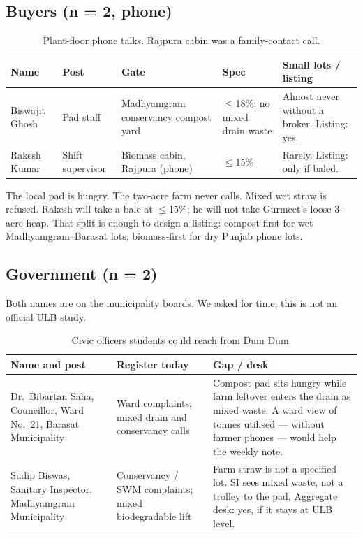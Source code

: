\documentclass[12pt,a4paper]{article}
\begin{document}
\subsection{Buyers (n = 2, phone)}
\begin{table}[h]
\centering
\caption{Plant-floor phone talks. Rajpura cabin was a family-contact call.}
\label{tab:buyers}
\small
\begin{tabularx}{\textwidth}{@{}>{\raggedright\arraybackslash}p{2.6cm}>{\raggedright\arraybackslash}p{2.2cm}>{\raggedright\arraybackslash}p{3.4cm}>{\raggedright\arraybackslash}p{2.2cm}X@{}}
\toprule
\textbf{Name} & \textbf{Post} & \textbf{Gate} & \textbf{Spec} & \textbf{Small lots / listing} \\
\midrule
Biswajit Ghosh & Pad staff & Madhyamgram conservancy compost yard & $\le$18\%; no mixed drain waste & Almost never without a broker. Listing: yes. \\
Rakesh Kumar & Shift supervisor & Biomass cabin, Rajpura (phone) & $\le$15\% & Rarely. Listing: only if baled. \\
\bottomrule
\end{tabularx}
\end{table}

The local pad is hungry. The two-acre farm never calls. Mixed wet straw is refused. Rakesh will take a bale at $\le$15\%; he will not take Gurmeet's loose 3-acre heap. That split is enough to design a listing: compost-first for wet Madhyamgram--Barasat lots, biomass-first for dry Punjab phone lots.

\subsection{Government (n = 2)}
Both names are on the municipality boards. We asked for time; this is not an official ULB study.

\begin{table}[h]
\centering
\caption{Civic officers students could reach from Dum Dum.}
\label{tab:gov}
\small
\begin{tabularx}{\textwidth}{@{}>{\raggedright\arraybackslash}p{4.1cm}>{\raggedright\arraybackslash}p{3.3cm}X@{}}
\toprule
\textbf{Name and post} & \textbf{Register today} & \textbf{Gap / desk} \\
\midrule
Dr.\ Bibartan Saha, Councillor, Ward No.~21, Barasat Municipality & Ward complaints; mixed drain and conservancy calls & Compost pad sits hungry while farm leftover enters the drain as mixed waste. A ward view of tonnes utilised --- without farmer phones --- would help the weekly note. \\
Sudip Biswas, Sanitary Inspector, Madhyamgram Municipality & Conservancy / SWM complaints; mixed biodegradable lift & Farm straw is not a specified lot. SI sees mixed waste, not a trolley to the pad. Aggregate desk: yes, if it stays at ULB level. \\
\bottomrule
\end{tabularx}
\end{table}
\end{document}
